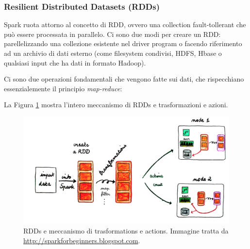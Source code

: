 \documentclass[12pt,italian]{article}
\renewcommand{\texttt}[1]{%
	\begingroup
	\ttfamily
	\begingroup\lccode`~=`/\lowercase{\endgroup\def~}{/\discretionary{}{}{}}%
	\begingroup\lccode`~=`[\lowercase{\endgroup\def~}{[\discretionary{}{}{}}%
	\begingroup\lccode`~=`.\lowercase{\endgroup\def~}{.\discretionary{}{}{}}%
	\catcode`/=\active\catcode`[=\active\catcode`.=\active
	\scantokens{#1\noexpand}%
	\endgroup
}
\begin{document}
\subsubsection{Resilient Distributed Datasets (RDDs)}\label{sec:RDD}
Spark ruota attorno al concetto di RDD, ovvero una collection fault-tollerant che può essere processata in parallelo. Ci sono due modi per creare un RDD: parellelizzando una collezione esistente nel driver program o facendo riferimento ad un archivio di dati esterno (come filesystem condivisi, HDFS, Hbase o qualsiasi input che ha dati in formato Hadoop).

Ci sono due operazioni fondamentali che vengono fatte sui dati, che rispecchiano essenzialemente il principio \textit{map-reduce}:
La Figura \ref{fig:RDDs} mostra l'intero meccanismo di RDDs e trasformazioni e azioni.
\begin{figure}
	\centering 
	\includegraphics[width=1\linewidth]{img/rdds.png}
	\caption{RDDs e meccanismo di trasformations e actions. Immagine tratta da \url{http://sparkforbeginners.blogspot.com}.}
	\label{fig:RDDs}
\end{figure}
\end{document}
